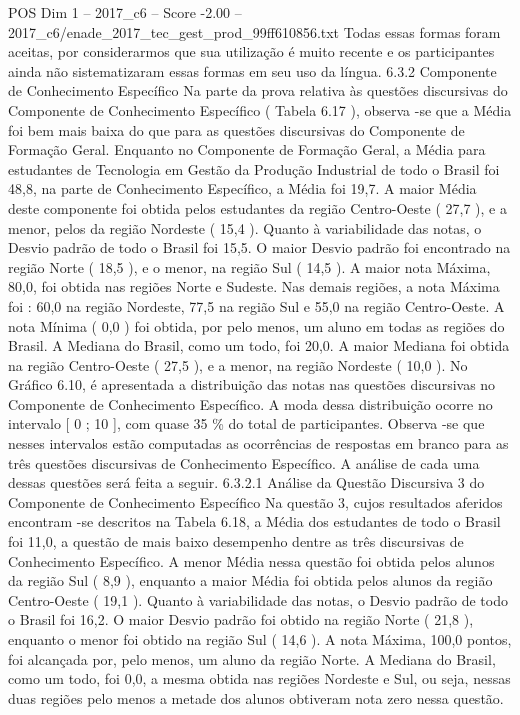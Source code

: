\begin{textsample}{POS Dim 1 – 2017\_c6 – Score -2.00 – 2017\_c6/enade\_2017\_tec\_gest\_prod\_99ff610856.txt}
Todas essas formas foram aceitas, por considerarmos que sua utilização é muito recente e os participantes ainda não sistematizaram essas formas em seu uso da língua. 6.3.2 Componente de Conhecimento Específico Na parte da prova relativa às questões discursivas do Componente de Conhecimento Específico ( Tabela 6.17 ), observa -se que a Média foi bem mais baixa do que para as questões discursivas do Componente de Formação Geral.
Enquanto no Componente de Formação Geral, a Média para estudantes de Tecnologia em Gestão da Produção Industrial de todo o Brasil foi 48,8, na parte de Conhecimento Específico, a Média foi 19,7.
A maior Média deste componente foi obtida pelos estudantes da região Centro-Oeste ( 27,7 ), e a menor, pelos da região Nordeste ( 15,4 ).
Quanto à variabilidade das notas, o Desvio padrão de todo o Brasil foi 15,5.
O maior Desvio padrão foi encontrado na região Norte ( 18,5 ), e o menor, na região Sul ( 14,5 ).
A maior nota Máxima, 80,0, foi obtida nas regiões Norte e Sudeste.
Nas demais regiões, a nota Máxima foi : 60,0 na região Nordeste, 77,5 na região Sul e 55,0 na região Centro-Oeste.
A nota Mínima ( 0,0 ) foi obtida, por pelo menos, um aluno em todas as regiões do Brasil.
A Mediana do Brasil, como um todo, foi 20,0.
A maior Mediana foi obtida na região Centro-Oeste ( 27,5 ), e a menor, na região Nordeste ( 10,0 ).
No Gráfico 6.10, é apresentada a distribuição das notas nas questões discursivas no Componente de Conhecimento Específico.
A moda dessa distribuição ocorre no intervalo [ 0 ; 10 ], com quase 35 \% do total de participantes.
Observa -se que nesses intervalos estão computadas as ocorrências de respostas em branco para as três questões discursivas de Conhecimento Específico.
A análise de cada uma dessas questões será feita a seguir. 6.3.2.1 Análise da Questão Discursiva 3 do Componente de Conhecimento Específico Na questão 3, cujos resultados aferidos encontram -se descritos na Tabela 6.18, a Média dos estudantes de todo o Brasil foi 11,0, a questão de mais baixo desempenho dentre as três discursivas de Conhecimento Específico.
A menor Média nessa questão foi obtida pelos alunos da região Sul ( 8,9 ), enquanto a maior Média foi obtida pelos alunos da região Centro-Oeste ( 19,1 ).
Quanto à variabilidade das notas, o Desvio padrão de todo o Brasil foi 16,2.
O maior Desvio padrão foi obtido na região Norte ( 21,8 ), enquanto o menor foi obtido na região Sul ( 14,6 ).
A nota Máxima, 100,0 pontos, foi alcançada por, pelo menos, um aluno da região Norte.
A Mediana do Brasil, como um todo, foi 0,0, a mesma obtida nas regiões Nordeste e Sul, ou seja, nessas duas regiões pelo menos a metade dos alunos obtiveram nota zero nessa questão.

\end{textsample}
